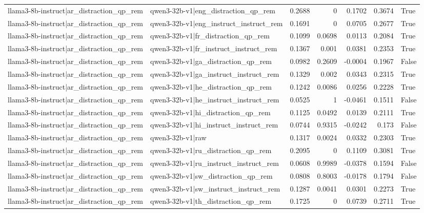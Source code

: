 \begin{table}
\begin{tabular}{l l r r r r l}
llama3-8b-instruct|ar_distraction_qp_rem & qwen3-32b-v1|eng_distraction_qp_rem & 0.2688 & 0 & 0.1702 & 0.3674 & True \\
llama3-8b-instruct|ar_distraction_qp_rem & qwen3-32b-v1|eng_instruct_instruct_rem & 0.1691 & 0 & 0.0705 & 0.2677 & True \\
llama3-8b-instruct|ar_distraction_qp_rem & qwen3-32b-v1|fr_distraction_qp_rem & 0.1099 & 0.0698 & 0.0113 & 0.2084 & True \\
llama3-8b-instruct|ar_distraction_qp_rem & qwen3-32b-v1|fr_instruct_instruct_rem & 0.1367 & 0.001 & 0.0381 & 0.2353 & True \\
llama3-8b-instruct|ar_distraction_qp_rem & qwen3-32b-v1|ga_distraction_qp_rem & 0.0982 & 0.2609 & -0.0004 & 0.1967 & False \\
llama3-8b-instruct|ar_distraction_qp_rem & qwen3-32b-v1|ga_instruct_instruct_rem & 0.1329 & 0.002 & 0.0343 & 0.2315 & True \\
llama3-8b-instruct|ar_distraction_qp_rem & qwen3-32b-v1|he_distraction_qp_rem & 0.1242 & 0.0086 & 0.0256 & 0.2228 & True \\
llama3-8b-instruct|ar_distraction_qp_rem & qwen3-32b-v1|he_instruct_instruct_rem & 0.0525 & 1 & -0.0461 & 0.1511 & False \\
llama3-8b-instruct|ar_distraction_qp_rem & qwen3-32b-v1|hi_distraction_qp_rem & 0.1125 & 0.0492 & 0.0139 & 0.2111 & True \\
llama3-8b-instruct|ar_distraction_qp_rem & qwen3-32b-v1|hi_instruct_instruct_rem & 0.0744 & 0.9315 & -0.0242 & 0.173 & False \\
llama3-8b-instruct|ar_distraction_qp_rem & qwen3-32b-v1|raw & 0.1317 & 0.0024 & 0.0332 & 0.2303 & True \\
llama3-8b-instruct|ar_distraction_qp_rem & qwen3-32b-v1|ru_distraction_qp_rem & 0.2095 & 0 & 0.1109 & 0.3081 & True \\
llama3-8b-instruct|ar_distraction_qp_rem & qwen3-32b-v1|ru_instruct_instruct_rem & 0.0608 & 0.9989 & -0.0378 & 0.1594 & False \\
llama3-8b-instruct|ar_distraction_qp_rem & qwen3-32b-v1|sw_distraction_qp_rem & 0.0808 & 0.8003 & -0.0178 & 0.1794 & False \\
llama3-8b-instruct|ar_distraction_qp_rem & qwen3-32b-v1|sw_instruct_instruct_rem & 0.1287 & 0.0041 & 0.0301 & 0.2273 & True \\
llama3-8b-instruct|ar_distraction_qp_rem & qwen3-32b-v1|th_distraction_qp_rem & 0.1725 & 0 & 0.0739 & 0.2711 & True \\

\end{tabular}
\end{table}
